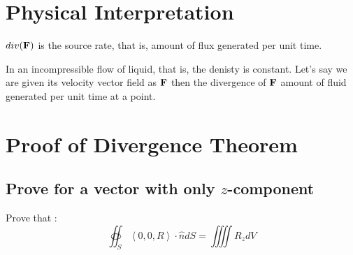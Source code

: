 \section{Physical Interpretation}

$div({\bf F})$ is the source rate, that is, amount of flux generated per unit time.

In an incompressible flow of liquid, that is, the denisty is constant. 
Let's say we are given its velocity vector field as ${\bf F}$ then the divergence of ${\bf F}$
amount of fluid generated per unit time at a point.

\section{Proof of Divergence Theorem}

\subsection{Prove for a vector with only $z$-component}

Prove that : $$ \oiint_S \left< 0, 0, R \right> \cdot \hat{n} dS = \iiiint R_z dV $$